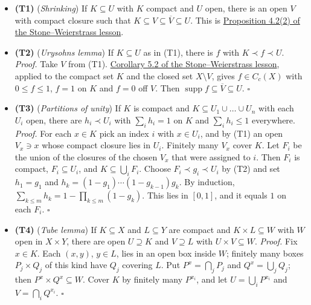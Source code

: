\documentclass[
  english,
  11pt,
  a4paper,
]{article}
\providecommand{\tightlist}{%
  \setlength{\itemsep}{0pt}\setlength{\parskip}{0pt}}
\begin{document}
\begin{itemize}
\tightlist
\item
  \textbf{(T1)} (\emph{Shrinking}) If \(K\subseteq U\) with \(K\)
  compact and \(U\) open, there is an open \(V\) with compact closure
  such that \(K\subseteq V\subseteq\overline V\subseteq U\). This is
  \hyperlink{the-stone-weierstrass-theorem-for-functions-vanishing-at-infinity--oa-fnd-sw-15}{Proposition
  4.2(2) of the Stone--Weierstrass lesson}.
\item
  \textbf{(T2)} (\emph{Urysohn\textquotesingle s lemma}) If
  \(K\subseteq U\) as in (T1), there is \(f\) with \(K\prec f\prec U\).
  \emph{Proof.} Take \(V\) from (T1).
  \hyperlink{the-stone-weierstrass-theorem-for-functions-vanishing-at-infinity--oa-fnd-sw-16}{Corollary
  5.2 of the Stone--Weierstrass lesson}, applied to the compact set
  \(K\) and the closed set \(X\setminus V\), gives \(f\in C_c(X)\) with
  \(0\leq f\leq1\), \(f=1\) on \(K\) and \(f=0\) off \(V\). Then
  \(\operatorname{supp}f\subseteq\overline V\subseteq U\). \(\square\)
\item
  \textbf{(T3)} (\emph{Partitions of unity}) If \(K\) is compact and
  \(K\subseteq U_1\cup\dots\cup U_n\) with each \(U_i\) open, there are
  \(h_i\prec U_i\) with \(\sum_ih_i=1\) on \(K\) and \(\sum_ih_i\leq1\)
  everywhere. \emph{Proof.} For each \(x\in K\) pick an index \(i\) with
  \(x\in U_i\), and by (T1) an open \(V_x\ni x\) whose compact closure
  lies in \(U_i\). Finitely many \(V_x\) cover \(K\). Let \(F_i\) be the
  union of the closures of the chosen \(V_x\) that were assigned to
  \(i\). Then \(F_i\) is compact, \(F_i\subseteq U_i\), and
  \(K\subseteq\bigcup_iF_i\). Choose \(F_i\prec g_i\prec U_i\) by (T2)
  and set \(h_1=g_1\) and \(h_k=(1-g_1)\cdots(1-g_{k-1})g_k\). By
  induction, \(\sum_{k\leq m}h_k=1-\prod_{k\leq m}(1-g_k)\). This lies
  in \([0,1]\), and it equals \(1\) on each \(F_i\). \(\square\)
\item
  \textbf{(T4)} (\emph{Tube lemma}) If \(K\subseteq X\) and
  \(L\subseteq Y\) are compact and \(K\times L\subseteq W\) with \(W\)
  open in \(X\times Y\), there are open \(U\supseteq K\) and
  \(V\supseteq L\) with \(U\times V\subseteq W\). \emph{Proof.} Fix
  \(x\in K\). Each \((x,y)\), \(y\in L\), lies in an open box inside
  \(W\); finitely many boxes \(P_j\times Q_j\) of this kind have \(Q_j\)
  covering \(L\). Put \(P^x=\bigcap_jP_j\) and \(Q^x=\bigcup_jQ_j\);
  then \(P^x\times Q^x\subseteq W\). Cover \(K\) by finitely many
  \(P^{x_i}\), and let \(U=\bigcup_iP^{x_i}\) and
  \(V=\bigcap_iQ^{x_i}\). \(\square\)
\end{itemize}
\end{document}
